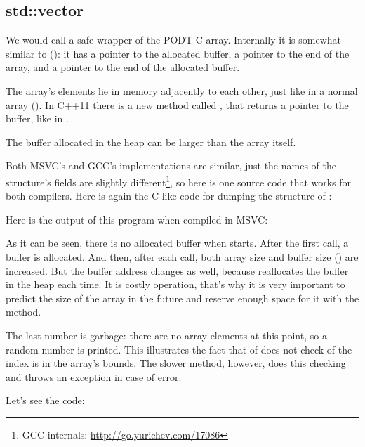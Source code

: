 \subsection{std::vector}

We would call  a safe wrapper of the \ac{PODT} C array.
Internally it is somewhat similar to  ():
it has a pointer to the allocated buffer, a pointer to the end of the array, and a pointer to the end of the allocated buffer.

The array's elements  lie in memory adjacently to each other, just like in a normal array ().
In C++11 there is a new method called  , that returns a pointer to the buffer, like  in .

The buffer allocated in the \gls{heap} can be larger than the array itself.

Both MSVC's and GCC's implementations are similar, just the names of the structure's fields are slightly different\footnote
{GCC internals: \url{http://go.yurichev.com/17086}}, so here is one source
code that works for both compilers.
Here is again the C-like code for dumping the structure of :



Here is the output of this program when compiled in MSVC:



As it can be seen, there is no allocated buffer when \main starts.
After the first  call, a buffer is allocated.
And then, after each  
call, both array size and buffer size () are increased.
But the buffer address changes as well, because  
reallocates the buffer in the \gls{heap} each time.
It is costly operation, that's why it is very important to predict the size of the array in the future and reserve 
enough space for it with the  method.

The last number is garbage: there are no array elements at this point, so a random number is printed.
This illustrates the fact that  of 
 does not check of the index is in the array's bounds.
The slower  
method, however, does this checking and throws an  
exception in case of error.

Let's see the code:

